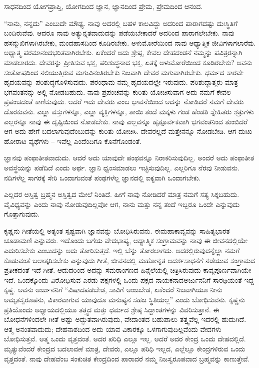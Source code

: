 ಸಾಧನದಿಂದ ಯೋಗಪ್ರಾಪ್ತಿ, ಯೋಗದಿಂದ ಜ್ಞಾನ, ಜ್ಞಾನದಿಂದ ಪ್ರೇಮ, ಪ್ರೇಮದಿಂದ ಆನಂದ.

“ನಾನು, ನನ್ನದು” ಎಂಬುದೇ ಮೌಢ್ಯ. ನಾವು ಅದರಲ್ಲಿ ಬಹಳ ಕಾಲವಿದ್ದು ಅದರಿಂದ ಪಾರಾಗದಷ್ಟು ದುಃಸ್ಥಿತಿಗೆ ಬಂದಿರುವೆವು. ಆದರೂ ನಾವು ಅತ್ಯುನ್ನತವಾದುದನ್ನು ಪಡೆಯಬೇಕಾದರೆ ಅದರಿಂದ ಪಾರಾಗಲೇಬೇಕು. ನಾವು ಹಸನ್ಮುಖಿಗಳಾಗಿರಬೇಕು, ಮಂದಹಾಸದಿಂದ ಕೂಡಿರಬೇಕು. ಅಳುಮೋರೆಯಿಂದ ನಾವು ಆಧ್ಯಾತ್ಮಿಕ ಜೀವಿಗಳಾಗಲಾರೆವು. ಅಧ್ಯಾತ್ಮ ಪರಮಾನಂದಭರಿತವಾಗಿರಬೇಕು. ಏಕೆಂದರೆ ಅದು ಶ್ರೇಷ್ಠ, ಕೇವಲ ದೇಹದಂಡನೆ ನಮ್ಮನ್ನು ಪವಿತ್ರರನ್ನಾಗಿ ಮಾಡಲಾರದು. ದೇವರನ್ನು ಪ್ರೀತಿಸುವ ಭಕ್ತ, ಪರಿಶುದ್ಧನಾದ ಭಕ್ತ, ಏತಕ್ಕೆ ಅಳುಮೋರೆಯಿಂದ ಕೂಡಿರಬೇಕು? ಅವನು ಸಂತೋಷದಿಂದ ನಲಿಯುತ್ತಿರುವ ಮಗುವಿನಂತಿರಬೇಕು ನಿಜವಾಗಿ ದೇವರ ಮಗುವಾಗಿರಬೇಕು. ಧರ್ಮದ ಸಾರವೇ ಹೃದಯವನ್ನು ಪರಿಶುದ್ಧಗೊಳಿಸುವುದು. ಪರಂಧಾಮ ನಮ್ಮ ಹೃದಯದಲ್ಲೇ ಇರುವುದು. ಪರಿಶುದ್ಧಾತ್ಮರು ಮಾತ್ರ ಭಗವಂತನನ್ನು ಅಲ್ಲಿ ನೋಡಬಹುದು. ನಾವು ಪ್ರಪಂಚವನ್ನು ಕುರಿತು ಯೋಚಿಸುವಾಗ ಅದು ನಮಗೆ ಕೇವಲ ಪ್ರಪಂಚದಂತೆ ಕಾಣಿಸುವುದು. ಆದರೆ ಇದು ದೇವರು ಎಂಬ ಭಾವನೆಯಿಂದ ಅದನ್ನು ನೋಡಿದರೆ ನಮಗೆ ದೇವರು ದೊರಕುವನು. ಎಲ್ಲಾ ವಸ್ತುಗಳನ್ನೂ, ಎಲ್ಲಾ ವ್ಯಕ್ತಿಗಳನ್ನೂ, ತಾಯಿ ತಂದೆ ಮಕ್ಕಳು ಗಂಡ ಹೆಂಡತಿ ಸ್ನೇಹಿತರು ಶತ್ರುಗಳು ಎಲ್ಲರನ್ನೂ ನಾವು ಈ ದೃಷ್ಟಿಯಿಂದ ನೋಡಬೇಕು. ನಾವು ಎಲ್ಲವನ್ನೂ ಹೃತ್ಪೂರ್ವಕವಾಗಿ ಭಗವಂತನಿಂದ ತುಂಬಿದರೆ ಆಗ ಅದು ಹೇಗೆ ಬದಲಾಗುವುದೆಂಬುದನ್ನು ಕುರಿತು ಯೋಚಿಸಿ. ದೇವರಲ್ಲದೆ ಮತ್ತೇನನ್ನೂ ನೋಡಬೇಡಿ. ಆಗ ದುಃಖ ಹೋರಾಟ ವ್ಯಥೆಗಳು – ಇವೆಲ್ಲ ಎಂದೆಂದಿಗೂ ಕೊನೆಗೊಂಡಂತೆ.

ಜ್ಞಾನವು ಪಂಥಾತೀತವಾದುದು. ಆದರೆ ಅದು ಯಾವುದೇ ಪಂಥವನ್ನೂ ನಿರಾಕರಿಸುವುದಿಲ್ಲ. ಅಂದರೆ ಅದು ಪಂಥಾತೀತ ಅವಸ್ಥೆಯನ್ನು ಪಡೆದಿದೆ ಎಂದು ಅರ್ಥ. ಜ್ಞಾನಿ ಧ್ವಂಸಮಾಡಲು ಇಚ್ಛಿಸುವುದಿಲ್ಲ. ಎಲ್ಲರಿಗೂ ನೆರವು ನೀಡುವನು. ನದಿಗಳೆಲ್ಲ ಸಾಗರಕ್ಕೆ ಸೇರಿ ಒಂದಾಗುವಂತೆ ಪಂಥಗಳೆಲ್ಲ ಜ್ಞಾನದಲ್ಲಿ ಐಕ್ಯವಾಗಿ ಒಂದಾಗಬೇಕು.

ಎಲ್ಲದರ ಅಸ್ತಿತ್ವ ಬ್ರಹ್ಮನ ಅಸ್ತಿತ್ವದ ಮೇಲೆ ನಿಂತಿದೆ. ಹೀಗೆ ನಾವು ನೋಡಿದರೆ ಮಾತ್ರ ನಮಗೆ ಸತ್ಯ ಸಿಕ್ಕಬಹುದು. ವೈವಿಧ್ಯವನ್ನು ಎಂದು ನಾವು ನೋಡುವುದಿಲ್ಲವೋ ಆಗ, ನಾನು ಮತ್ತು ನನ್ನ ತಂದೆ ಇಬ್ಬರೂ ಒಂದೇ ಎನ್ನುವುದು ಗೊತ್ತಾಗುವುದು.

ಕೃಷ್ಣನು ಗೀತೆಯಲ್ಲಿ ಅತ್ಯಂತ ಸ್ಪಷ್ಟವಾಗಿ ಜ್ಞಾನವನ್ನು ಬೋಧಿಸಿರುವನು. ಈ\break ಮಹಾಕಾವ್ಯವನ್ನು ಸಾಹಿತ್ಯಭಾರತ ಚೂಡಾಮಣಿ ಎನ್ನುವರು. ಇದೊಂದು ಬಗೆಯ ವೇದಭಾಷ್ಯ, ಆಧ್ಯಾತ್ಮಿಕ ಸಂಗ್ರಾಮವನ್ನು ನಾವು ಈ ಜೀವನದಲ್ಲಿಯೇ ಎದುರಿಸಬೇಕು ಎಂಬುದನ್ನು ಅದು ತೋರಿಸುತ್ತದೆ. ಇಲ್ಲಿ ಬೆನ್ನು ತೋರಲಾಗದು. ಅದರಲ್ಲಿರುವುದನ್ನೆಲ್ಲಾ ನಮಗೆ ಕೊಡುವಂತೆ ಬಲಾತ್ಕರಿಸಬೇಕು ಎನ್ನುವುದು ಗೀತೆ, ಜೀವನದಲ್ಲಿ ಮಹೋನ್ನತ ಆದರ್ಶಸಾಧನೆಗೆ ನಡೆಯುವ ಸಂಗ್ರಾಮದ ಪ್ರತೀಕದಂತೆ ಇದೆ ಗೀತೆ. ಆದುದರಿಂದ ಅದನ್ನು ಸಮರಾಂಗಣದ ಹಿನ್ನೆಲೆಯಲ್ಲಿ ಚಿತ್ರಿಸಿರುವುದು ಕಾವ್ಯಪೂರ್ಣವಾಗಿಯೇ ಇದೆ. ಒಂದಕ್ಕೊಂದು ವಿರೋಧಿಸುವ ಎರಡು ಪಕ್ಷಗಳಲ್ಲಿ ಒಂದು ಪಕ್ಷದ ನಾಯಕನಾದ\break ಅರ್ಜುನನಿಗೆ ಸಾರಥಿಯಂತೆ ಇದ್ದ ಕೃಷ್ಣ. ಅವನು ಅರ್ಜುನನಿಗೆ “ವಿಷಾದಪಡಬೇಡ, ಸಾವಿಗೆ ಅಂಜಬೇಡ, ಏಕೆಂದರೆ ನಿಜವಾಗಿಯೂ ನೀನು ಅಮೃತಸ್ವರೂಪನು, ವಿಕಾರವಾಗುವ ಯಾವುದೂ ಮನುಷ್ಯನ ಸಹಜ ಸ್ಥಿತಿಯಲ್ಲ'' ಎಂದು ಬೋಧಿಸುವನು. ಕೃಷ್ಣನು ಪ್ರತಿಯೊಂದು ಅಧ್ಯಾಯದಲ್ಲಿಯೂ ತತ್ತ್ವದ ಮತ್ತು ಧರ್ಮದ ಶ್ರೇಷ್ಠ ಸಿದ್ದಾಂತಗಳನ್ನು ವಿವರಿಸುತ್ತಾನೆ. ಈ ಬೋಧನೆಗಳಿಂದಲೇ ಗೀತೆ ಅಷ್ಟು ಅದ್ಭುತವಾಗಿರುವುದು, ವೇದಾಂತದ ಬಹುಪಾಲು ತತ್ತ್ವವೆಲ್ಲ ಇದರಲ್ಲಿ ಹುದುಗಿದೆ. ಆತ್ಮ ಅನಂತವಾದುದು; ದೇಹನಾಶದಿಂದ ಅದು ಯಾವ ವಿಕಾರಕ್ಕೂ ಒಳಗಾಗುವುದಿಲ್ಲವೆಂದು ವೇದಗಳು ಬೋಧಿಸುತ್ತವೆ. ಆತ್ಮ ಒಂದು ವೃತ್ತದಂತೆ. ಅದರ ಪರಿಧಿ ಎಲ್ಲೂ ಇಲ್ಲ. ಆದರೆ ಅದರ ಕೇಂದ್ರ ಒಂದು ದೇಹದಲ್ಲಿದೆ. ಮೃತ್ಯುವೆಂದರೆ ಕೇಂದ್ರದ ಬದಲಾವಣೆ ಮಾತ್ರ, ದೇವರು, ಎಲ್ಲೂ ಪರಿಧಿ ಇಲ್ಲದ, ಎಲ್ಲೆಲ್ಲೂ ಕೇಂದ್ರಗಳಿರುವ ಒಂದು ವೃತ್ತದಂತೆ. ನಾವು ದೇಹವೆಂಬ ಸಂಕುಚಿತ ಕೇಂದ್ರದಿಂದ ಪಾರಾದರೆ ನಮ್ಮ ನಿಜಸ್ವರೂಪವಾದ ಬ್ರಹ್ಮವನ್ನು ಕಾಣುತ್ತೇವೆ.

